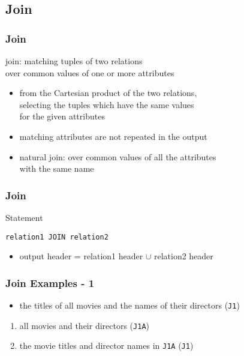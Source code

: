 \documentclass[dvipsnames]{beamer}
\theoremstyle{plain}
\begin{document}
\subsection{Join}

\begin{frame}[fragile]
  \frametitle{Join}

  \begin{definition}
    \alert{join}: matching tuples of two relations\\
      over common values of one or more attributes
  \end{definition}

  \begin{itemize}
    \item from the Cartesian product of the two relations,\\
      selecting the tuples which have the same values\\
      for the given attributes
    \item matching attributes are not repeated in the output

    \pause
    \item \alert{natural join}: over common values of all the attributes\\
      with the same name
  \end{itemize}
\end{frame}

\begin{frame}[fragile]
  \frametitle{Join}

  \begin{block}{Statement}
    \begin{lstlisting}
relation1 JOIN relation2
    \end{lstlisting}
  \end{block}

  \pause
  \begin{itemize}
    \item output header = relation1 header $\cup$ relation2 header
  \end{itemize}
\end{frame}

\begin{frame}
  \frametitle{Join Examples - 1}

  \begin{example}
    \begin{itemize}
      \item the titles of all movies and the names of their directors
        (\texttt{J1})
    \end{itemize}

    \pause
    \begin{enumerate}
      \item all movies and their directors (\texttt{J1A})

      \pause
      \item the movie titles and director names in \texttt{J1A} (\texttt{J1})
    \end{enumerate}
  \end{example}
\end{frame}
\end{document}
